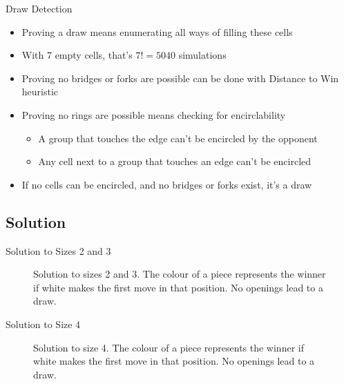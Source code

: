 \documentclass{beamer} %
\begin{document}
\begin{frame}{Draw Detection}
\begin{itemize}
\item Proving a draw means enumerating all ways of filling these cells
\item With 7 empty cells, that's $7! = 5040$ simulations
\item Proving no bridges or forks are possible can be done with Distance to Win heuristic
\item Proving no rings are possible means checking for encirclability
	\begin{itemize}
	\item A group that touches the edge can't be encircled by the opponent
	\item Any cell next to a group that touches an edge can't be encircled
	\end{itemize}
\item If no cells can be encircled, and no bridges or forks exist, it's a draw
\end{itemize}
\end{frame}


\subsection{Solution}

\begin{frame}{Solution to Sizes 2 and 3}
\begin{figure}[tb]
\centering
	\begin{HavannahBoard}[board size=2,coordinate style=classical,show coordinates=false]
	\end{HavannahBoard}
	\begin{HavannahBoard}[board size=3,coordinate style=classical,show coordinates=false]
	\end{HavannahBoard}
\caption{Solution to sizes 2 and 3. The colour of a piece represents the winner if white makes the first move in that position. No openings lead to a draw.}
\end{figure}
\end{frame}


\begin{frame}{Solution to Size 4}
\begin{figure}[tb]
\centering
	\begin{HavannahBoard}[board size=4,coordinate style=classical,show coordinates=false]
	\end{HavannahBoard}
\caption{Solution to size 4. The colour of a piece represents the winner if white makes the first move in that position. No openings lead to a draw.}
\end{figure}
\end{frame}
\end{document}
